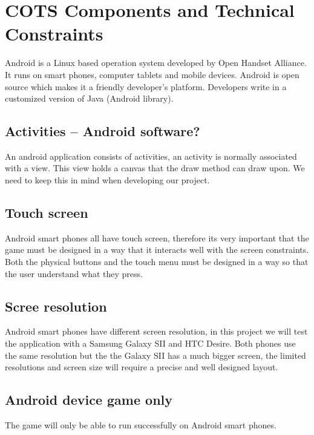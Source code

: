 \section{COTS Components and Technical Constraints}
Android \cite{Android} is a Linux based operation system developed by Open Handset Alliance. It runs on smart phones, computer tablets and mobile devices. Android is open source which makes it a friendly developer's platform. Developers write in a customized version of Java (Android library).

\subsection{Activities -- Android software?}
An android application consists of activities, an activity is normally associated with a view. This view holds a canvas that the draw method can draw upon. We need to keep this in mind when developing our project.

\subsection{Touch screen}
Android smart phones all have touch screen, therefore its very important that the game must be designed in a way that it interacts well with the screen constraints. Both the physical buttons and the touch menu must be designed in a way so that the user understand what they press.

\subsection{Scree resolution}
Android smart phones have different screen resolution, in this project we will test the application with a Samsung Galaxy SII and HTC Desire. Both phones use the same resolution but the the Galaxy SII has a much bigger screen, the limited resolutions and screen size will require a precise and well designed layout.

\subsection{Android device game only}
The game will only be able to run successfully on Android smart phones.


